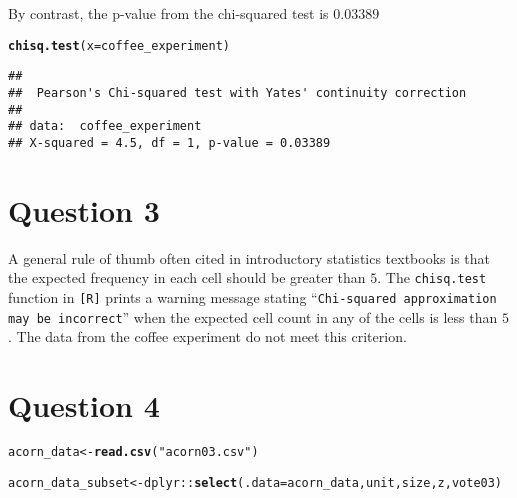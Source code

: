 \documentclass[11pt]{article}\usepackage[]{graphicx}\usepackage[]{color}
\makeatletter
\newcommand{\hlstr}[1]{\textcolor[rgb]{0.192,0.494,0.8}{#1}}%
\newcommand{\hlopt}[1]{\textcolor[rgb]{0,0,0}{#1}}%
\newcommand{\hlstd}[1]{\textcolor[rgb]{0.345,0.345,0.345}{#1}}%
\newcommand{\hlkwb}[1]{\textcolor[rgb]{0.69,0.353,0.396}{#1}}%
\newcommand{\hlkwc}[1]{\textcolor[rgb]{0.333,0.667,0.333}{#1}}%
\newcommand{\hlkwd}[1]{\textcolor[rgb]{0.737,0.353,0.396}{\textbf{#1}}}%
\newenvironment{kframe}{%
 \def\at@end@of@kframe{}%
 \ifinner\ifhmode%
  \def\at@end@of@kframe{\end{minipage}}%
  \begin{minipage}{\columnwidth}%
 \fi\fi%
 \def\FrameCommand##1{\hskip\@totalleftmargin \hskip-\fboxsep
 \colorbox{shadecolor}{##1}\hskip-\fboxsep
     \hskip-\linewidth \hskip-\@totalleftmargin \hskip\columnwidth}%
 \MakeFramed {\advance\hsize-\width
   \@totalleftmargin\z@ \linewidth\hsize
   \@setminipage}}%
 {\par\unskip\endMakeFramed%
 \at@end@of@kframe}
\newenvironment{knitrout}{}{} %
\theoremstyle{newstyle}
\makeatother
\begin{document}
By contrast, the p-value from the chi-squared test is $0.03389$

\begin{knitrout}
\color{fgcolor}\begin{kframe}
\begin{alltt}
\hlkwd{chisq.test}\hlstd{(}\hlkwc{x} \hlstd{= coffee_experiment)}
\end{alltt}


{\ttfamily\noindent\color{warningcolor}{\#\# Warning in chisq.test(x = coffee\_experiment): Chi-squared approximation may be incorrect}}\begin{verbatim}
## 
## 	Pearson's Chi-squared test with Yates' continuity correction
## 
## data:  coffee_experiment
## X-squared = 4.5, df = 1, p-value = 0.03389
\end{verbatim}
\end{kframe}
\end{knitrout}

\section{Question 3}

A general rule of thumb often cited in introductory statistics textbooks is that the expected frequency in each cell should be greater than $5$. The \texttt{chisq.test} function in \texttt{[R]} prints a warning message stating ``\texttt{Chi-squared approximation may be incorrect}'' when the expected cell count in any of the cells is less than $5$. The data from the coffee experiment do not meet this criterion.

\section{Question 4}

\begin{knitrout}
\color{fgcolor}\begin{kframe}
\begin{alltt}
\hlstd{acorn_data} \hlkwb{<-} \hlkwd{read.csv}\hlstd{(}\hlstr{"acorn03.csv"}\hlstd{)}

\hlstd{acorn_data_subset} \hlkwb{<-} \hlstd{dplyr}\hlopt{::}\hlkwd{select}\hlstd{(}\hlkwc{.data} \hlstd{= acorn_data, unit, size, z, vote03)}
\end{alltt}
\end{kframe}
\end{knitrout}
\end{document}
